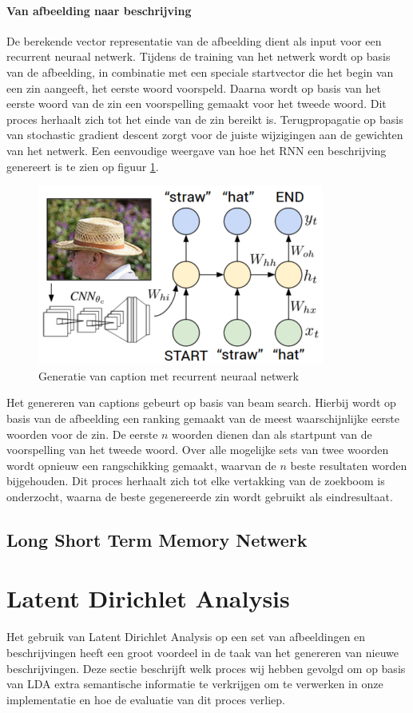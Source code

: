 \paragraph{Van afbeelding naar beschrijving}
De berekende vector representatie van de afbeelding dient als input voor een recurrent neuraal netwerk. Tijdens de training van het netwerk wordt op basis van de afbeelding, in combinatie met een speciale startvector die het begin van een zin aangeeft, het eerste woord voorspeld. Daarna wordt op basis van het eerste woord van de zin een voorspelling gemaakt voor het tweede woord. Dit proces herhaalt zich tot het einde van de zin bereikt is. Terugpropagatie op basis van stochastic gradient descent zorgt voor de juiste wijzigingen aan de gewichten van het netwerk. Een eenvoudige weergave van hoe het RNN een beschrijving genereert is te zien op figuur \ref{fig:rnntraining}.

\begin{figure}[tb]
    \centering
    \includegraphics[width=0.5\linewidth]{Images/karpathy.PNG}
    \caption{Generatie van caption met recurrent neuraal netwerk}
\label{fig:rnntraining}
\end{figure}

Het genereren van captions gebeurt op basis van beam search. Hierbij wordt op basis van de afbeelding een ranking gemaakt van de meest waarschijnlijke eerste woorden voor de zin. De eerste $n$ woorden dienen dan als startpunt van de voorspelling van het tweede woord. Over alle mogelijke sets van twee woorden wordt opnieuw een rangschikking gemaakt, waarvan de $n$ beste resultaten worden bijgehouden. Dit proces herhaalt zich tot elke vertakking van de zoekboom is onderzocht, waarna de beste gegenereerde zin wordt gebruikt als eindresultaat.

\subsection{Long Short Term Memory Netwerk}

\section{Latent Dirichlet Analysis}
Het gebruik van Latent Dirichlet Analysis op een set van afbeeldingen en beschrijvingen heeft een groot voordeel in de taak van het genereren van nieuwe beschrijvingen. Deze sectie beschrijft welk proces wij hebben gevolgd om op basis van LDA extra semantische informatie te verkrijgen om te verwerken in onze implementatie en hoe de evaluatie van dit proces verliep.

